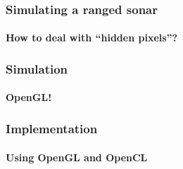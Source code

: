 \documentclass[
    beamer                                       %
  ,table,dvipsnames,svgnames
]{common/mytemplate}
\begin{document}
{
%
\begin{frame}
\frametitle{Simulating a ranged sonar}
\framesubtitle{How to deal with ``hidden pixels''?}
\vspace{8cm}                                                                                                                                                                                                                                                                                               
\end{frame}
}


{
%
\begin{frame}
\frametitle{Simulation}
\framesubtitle{OpenGL!}
\vspace{8cm}                                                                                                                                                                                                                                                                                               
\end{frame}
}





% 
% 
\begin{frame}
\frametitle{Implementation}
\framesubtitle{Using OpenGL and OpenCL}
\vspace{-15pt}
\begin{figure}[H]
\begin{narrow}{-0.9cm}{-0.9cm}
\end{narrow}
\end{figure}
\end{frame}
\end{document}

